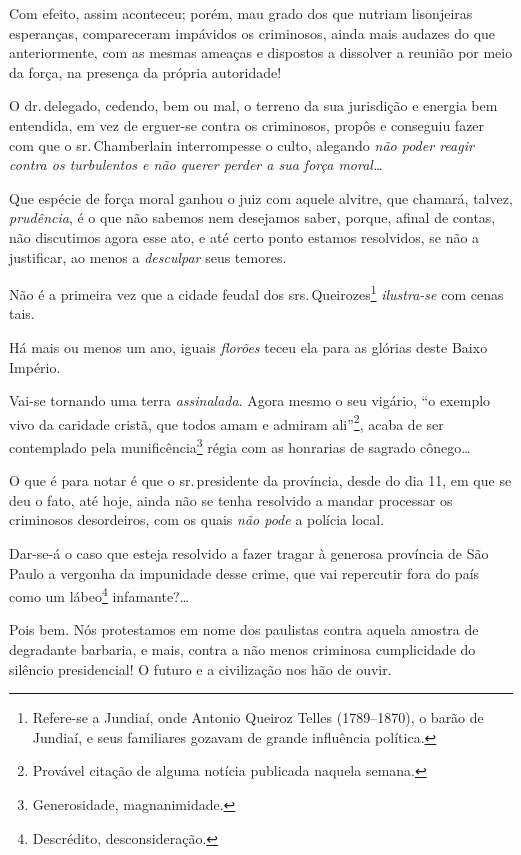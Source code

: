 Com efeito, assim aconteceu; porém, mau grado dos que nutriam
lisonjeiras esperanças, compareceram impávidos os criminosos, ainda mais
audazes do que anteriormente, com as mesmas ameaças e dispostos a
dissolver a reunião por meio da força, na presença da própria
autoridade!

O dr.\,delegado, cedendo, bem ou mal, o terreno da sua jurisdição e
energia bem entendida, em vez de erguer-se contra os criminosos, propôs
e conseguiu fazer com que o sr.\,Chamberlain interrompesse o culto,
alegando \emph{não poder reagir contra os turbulentos e não querer
perder a sua força moral\ldots{}}

Que espécie de força moral ganhou o juiz com aquele alvitre, que
chamará, talvez, \emph{prudência}, é o que não sabemos nem desejamos
saber, porque, afinal de contas, não discutimos agora esse ato, e até
certo ponto estamos resolvidos, se não a justificar, ao menos a
\emph{desculpar} seus temores.

Não é a primeira vez que a cidade feudal dos srs.\,Queirozes\footnote{
  Refere-se a Jundiaí, onde Antonio Queiroz Telles (1789--1870), o barão
  de Jundiaí, e seus familiares gozavam de grande influência política.}
\emph{ilustra-se} com cenas tais.

Há mais ou menos um ano, iguais \emph{florões} teceu ela para as glórias
deste Baixo Império.

Vai-se tornando uma terra \emph{assinalada}. Agora mesmo o seu vigário,
``o exemplo vivo da caridade cristã, que todos amam e admiram
ali''\footnote{Provável citação de alguma notícia publicada naquela
  semana.}, acaba de ser contemplado pela munificência\footnote{
  Generosidade, magnanimidade.} régia com as honrarias de sagrado
cônego\ldots{}

O que é para notar é que o sr.\,presidente da província, desde do dia 11,
em que se deu o fato, até hoje, ainda não se tenha resolvido a mandar
processar os criminosos desordeiros, com os quais \emph{não pode} a
polícia local.

Dar-se-á o caso que esteja resolvido a fazer tragar à generosa província
de São Paulo a vergonha da impunidade desse crime, que vai repercutir
fora do país como um lábeo\footnote{Descrédito, desconsideração.}
infamante?\ldots{}

Pois bem. Nós protestamos em nome dos paulistas contra aquela amostra de
degradante barbaria, e mais, contra a não menos criminosa cumplicidade
do silêncio presidencial! O futuro e a civilização nos hão de ouvir.


